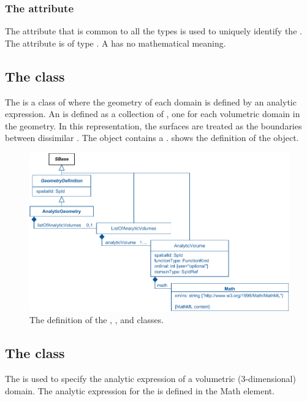 \subsubsection{The  attribute}
The  attribute that is common to all the \GeometryDefinition types is used to uniquely identify the \GeometryDefinition. The attribute is of type .  A \GeometryDefinition has no mathematical meaning.


\subsection{The  class}
\label{AnalyticGeometry-class}
\label{ListOfAnalyticVolumes-class}
The \AnalyticGeometry is a class of \GeometryDefinition where the geometry of each domain is defined by an analytic expression. An \AnalyticGeometry is defined as a collection of \AnalyticVolumes, one \AnalyticVolume for each volumetric domain in the geometry. In this representation, the surfaces are treated as the boundaries between dissimilar \AnalyticVolumes. The \AnalyticGeometry object contains a \ListOfAnalyticVolumes.  shows the definition of the \AnalyticGeometry object.

\begin{figure}[ht]
  \includegraphics{figs/AnalyticGeometry-uml}
  \caption{The definition of the \AnalyticGeometry, \ListOfAnalyticVolumes, and \AnalyticVolume classes.}
  \label{AnalyticGeometry-uml}
  \label{ListOfAnalyticVolumes-uml}
  \label{AnalyticVolume-uml}
\end{figure}


\subsection{The  class}
\label{AnalyticVolume-class}
The \AnalyticVolume is used to specify the analytic expression of a volumetric (3-dimensional) domain. The analytic expression for the \AnalyticVolume is defined in the Math element.

